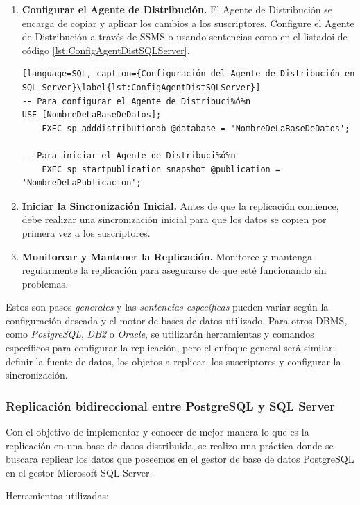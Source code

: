 \begin{enumerate}
	\item \textbf{Configurar el Agente de Distribución.} El Agente de Distribución se encarga de copiar y aplicar los cambios a los suscriptores. Configure el Agente de Distribución a través de SSMS o usando sentencias como en el listadoi de código \ref{lst:ConfigAgentDistSQLServer}.
	
	\begin{lstlisting}[language=SQL, caption={Configuración del Agente de Distribución en SQL Server}\label{lst:ConfigAgentDistSQLServer}]
-- Para configurar el Agente de Distribuci%ó%n
USE [NombreDeLaBaseDeDatos];
	EXEC sp_adddistributiondb @database = 'NombreDeLaBaseDeDatos';
	
-- Para iniciar el Agente de Distribuci%ó%n
	EXEC sp_startpublication_snapshot @publication = 'NombreDeLaPublicacion';
	\end{lstlisting}

	\item \textbf{Iniciar la Sincronización Inicial.} Antes de que la replicación comience, debe realizar una sincronización inicial para que los datos se copien por primera vez a los suscriptores.
	
	\item \textbf{Monitorear y Mantener la Replicación.} Monitoree y mantenga regularmente la replicación para asegurarse de que esté funcionando sin problemas.
\end{enumerate}
Estos son pasos \textit{generales} y las \textit{sentencias específicas} pueden variar según la configuración deseada y el motor de bases de datos utilizado. Para otros DBMS, como \textit{PostgreSQL}, \textit{DB2} o \textit{Oracle}, se utilizarán herramientas y comandos específicos para configurar la replicación, pero el enfoque general será similar: definir la fuente de datos, los objetos a replicar, los suscriptores y configurar la sincronización.

\subsubsection{Replicación bidireccional entre PostgreSQL y SQL Server}
\noindent
Con el objetivo de implementar y conocer de mejor manera lo que es la replicación en una base de datos distribuida, se realizo una práctica donde se buscara replicar los datos que poseemos en el gestor de base de datos PostgreSQL en el gestor Microsoft SQL Server.

Herramientas utilizadas:

